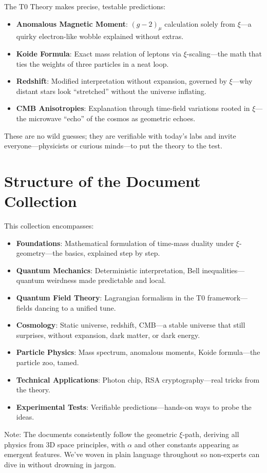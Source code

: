 	The T0 Theory makes precise, testable predictions:
	
	\begin{foundation}
		\begin{itemize}
			\item \textbf{Anomalous Magnetic Moment}: $(g-2)_\mu$ calculation solely from $\xi$—a quirky electron-like wobble explained without extras.
			\item \textbf{Koide Formula}: Exact mass relation of leptons via $\xi$-scaling—the math that ties the weights of three particles in a neat loop.
			\item \textbf{Redshift}: Modified interpretation without expansion, governed by $\xi$—why distant stars look ``stretched'' without the universe inflating.
			\item \textbf{CMB Anisotropies}: Explanation through time-field variations rooted in $\xi$—the microwave ``echo'' of the cosmos as geometric echoes.
		\end{itemize}
	\end{foundation}
	
	These are no wild guesses; they are verifiable with today's labs and invite everyone—physicists or curious minds—to put the theory to the test.
	
	\section{Structure of the Document Collection}
	
	This collection encompasses:
	
	\begin{itemize}
		\item \textbf{Foundations}: Mathematical formulation of time-mass duality under $\xi$-geometry—the basics, explained step by step.
		\item \textbf{Quantum Mechanics}: Deterministic interpretation, Bell inequalities—quantum weirdness made predictable and local.
		\item \textbf{Quantum Field Theory}: Lagrangian formalism in the T0 framework—fields dancing to a unified tune.
		\item \textbf{Cosmology}: Static universe, redshift, CMB—a stable universe that still surprises, without expansion, dark matter, or dark energy.
		\item \textbf{Particle Physics}: Mass spectrum, anomalous moments, Koide formula—the particle zoo, tamed.
		\item \textbf{Technical Applications}: Photon chip, RSA cryptography—real tricks from the theory.
		\item \textbf{Experimental Tests}: Verifiable predictions—hands-on ways to probe the ideas.
	\end{itemize}
	
	Note: The documents consistently follow the geometric $\xi$-path, deriving all physics from 3D space principles, with $\alpha$ and other constants appearing as emergent features. We've woven in plain language throughout so non-experts can dive in without drowning in jargon.
	